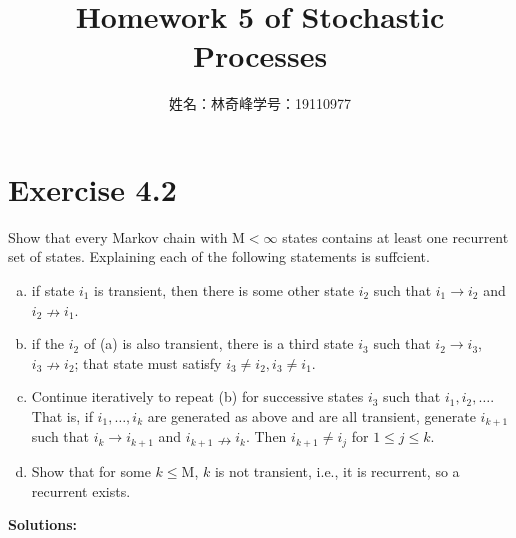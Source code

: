 \documentclass{article}
\begin{document}
    \title{Homework 5 of Stochastic Processes}
    \author{姓名：林奇峰\qquad 学号：19110977}
    \maketitle

    \section{Exercise 4.2}
    Show that every Markov chain with $\text{M}<\infty$ states contains at least one recurrent set of states. Explaining each of the following statements is suffcient.
    \begin{enumerate}[(a)]
        \item if state $i_1$ is transient, then there is some other state $i_2$ such that $i_1\rightarrow i_2$ and $i_2\nrightarrow i_1$.
        \item if the $i_2$ of (a) is also transient, there is a third state $i_3$ such that $i_2\rightarrow i_3$, $i_3\nrightarrow i_2$; that state must satisfy $i_3\neq i_2,i_3\neq i_1$.
        \item Continue iteratively to repeat (b) for successive states $i_3$ such that $i_1, i_2,\dots.$ That is, if $i_1,\dots,i_k$ are generated as above and are all transient, generate $i_{k+1}$ such that $i_k\rightarrow i_{k+1}$ and $i_{k+1}\nrightarrow i_k$. Then $i_{k+1}\neq i_j$ for $1\leq j\leq k$.
        \item Show that for some $k\leq \text{M}$, $k$ is not transient, i.e., it is recurrent, so a recurrent exists. 
    \end{enumerate}

    \textbf{Solutions:}
\end{document}
